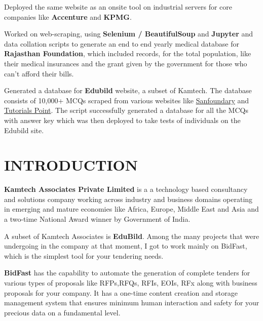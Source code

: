 \documentclass[14pt]{extarticle}
\newcommand\mainmatter{
    \cleardoublepage
    \pagenumbering{arabic}
}
\begin{document}
Deployed the same website as an onsite tool on industrial servers for core companies like \textbf{Accenture} and \textbf{KPMG}.

Worked on web-scraping, using \textbf{Selenium / BeautifulSoup} and \textbf{Jupyter} and data collation scripts to generate an end to end yearly medical database for \textbf{Rajasthan Foundation}, which included records, for the total population, like their medical insurances and the grant given by the government for those who can't afford their bills.

Generated a database for \textbf{Edubild} website, a subset of Kamtech. The database consists of 10,000+ MCQs scraped from various websites like \href{https:\\www.sanfoundary.com}{Sanfoundary} and \href{https:\\www.tutorialspoint.com}{Tutorials Point}. The script successfully generated a database for all the MCQs with answer key which was then deployed to take tests of individuals on the Edubild site.

\setlength{\parskip}{0em}

\newpage
{}
\begin{center}
    \tableofcontents
\end{center}

\mainmatter

\setlength{\parskip}{1em}

\newpage
\section{INTRODUCTION}

\par \textbf{Kamtech Associates Private Limited} is a a technology based consultancy and solutions company working across industry and business domains operating in emerging and mature economies like Africa, Europe, Middle East and Asia and a two-time National Award winner by Government of India.

\par A subset of Kamtech Associates is \textbf{EduBild}. Among the many projects that were undergoing in the company at that moment, I got to work mainly on BidFast, which is the simplest tool for your tendering needs.

\par \textbf{BidFast} has the capability to automate the generation of complete tenders for various types of proposals like RFPs,RFQs, RFIs, EOIs, RFx along with business proposals for your company. It has a one-time content creation and storage management system that ensures minimum human interaction and safety for your precious data on a fundamental level.
\end{document}
